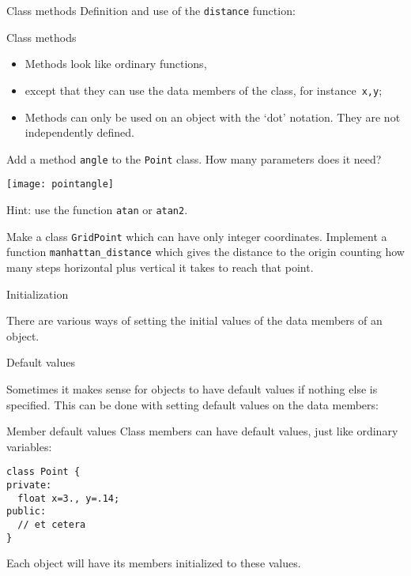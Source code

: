 \begin{block}{Class methods}
  \label{sl:method-define}
  Definition and use of the \lstinline{distance} function:
  
\end{block}

\begin{slide}{Class methods}
  \label{sl:method-observe}
  \begin{itemize}
  \item Methods look like ordinary functions,
  \item except that they can use the data members of the class, for
    instance~\lstinline{x,y};
  \item Methods can only be used on an object with the `dot' notation.
    They are not independently defined.
  \end{itemize}
\end{slide}

\begin{exercise}
  \label{ex:vectorclass-angle}
  Add a method \lstinline{angle} to the \lstinline{Point} class.
  How many parameters does it need?

  \texttt{[image: pointangle]}

  Hint: use the function \lstinline{atan} or \lstinline{atan2}.
\end{exercise}

\begin{exercise}
  \label{ex:manhattan}
  Make a class \lstinline{GridPoint} which can have only integer coordinates.
  Implement a function \lstinline{manhattan_distance} which gives the distance
  to the origin counting how many steps horizontal plus vertical it takes
  to reach that point.
\end{exercise}

 {Initialization}

There are various ways of setting the initial values
of the data members of an object.

 {Default values}

Sometimes it makes sense for objects to have default values
if nothing else is specified.
This can be done with setting default values on the data members:

\begin{block}{Member default values}
  \label{sl:class-defval}
  Class members can have default values, just like ordinary variables:
\begin{lstlisting}
class Point {
private:
  float x=3., y=.14;
public:
  // et cetera
}
\end{lstlisting}
  Each object will have its members initialized to these values.
\end{block}

